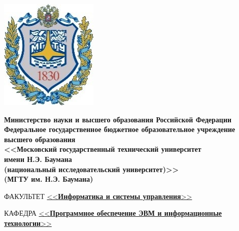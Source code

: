 \begin{titlepage}
    \noindent\begin{minipage}{0.05\textwidth}
                 \includegraphics[scale=0.4]{inc/bmstu}
    \end{minipage}
    \hfill
    \begin{minipage}{0.85\textwidth}\raggedleft
    \begin{center}
        \fontsize{12pt}{0.3\baselineskip}\selectfont \textbf{Министерство науки и высшего образования Российской Федерации \\ Федеральное государственное бюджетное образовательное учреждение \\ высшего образования \\ <<Московский государственный технический университет \\ имени Н.Э. Баумана \\ (национальный исследовательский университет)>> \\ (МГТУ им. Н.Э. Баумана)}
    \end{center}
    \end{minipage}

    \begin{center}
        \fontsize{12pt}{0.1\baselineskip}\selectfont
        \noindent\makebox[\linewidth]{\rule{\textwidth}{4pt}} \makebox[\linewidth]{\rule{\textwidth}{1pt}}
    \end{center}

    \begin{flushleft}
        \fontsize{12pt}{0.8\baselineskip}\selectfont

        ФАКУЛЬТЕТ \uline{<<\textbf{Информатика и системы управления}>> \hfill}

        КАФЕДРА \uline{\mbox{\hspace{4mm}} <<\textbf{Программное обеспечение ЭВМ и информационные технологии}>> \hfill}
    \end{flushleft}

    \vfill


\end{titlepage}
